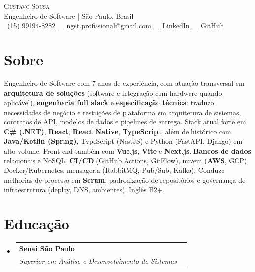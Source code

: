 \documentclass[letterpaper,11pt]{article}
\makeatletter
\newcommand{\resumeSubheading}[4]{
  \vspace{-2pt}\item
    \begin{tabular*}{1.0\textwidth}[t]{l@{\extracolsep{\fill}}r}
      \textbf{#1} & \textbf{\small #2} \\
      \textit{\small#3} & \textit{\small #4} \\
    \end{tabular*}\vspace{-7pt}
}
\newcommand{\resumeSubHeadingListStart}{\begin{itemize}[leftmargin=0.0in, label={}]}
\newcommand{\resumeSubHeadingListEnd}{\end{itemize}}
\makeatother
\begin{document}
\begin{center}
    {\Huge \scshape Gustavo Sousa} \\ \vspace{1pt}
    Engenheiro de Software \enskip | \enskip São Paulo, Brasil \\ \vspace{1pt}
    \small 
    \href{https://wa.me/+5515991948282}{\raisebox{-0.1\height}\faWhatsapp\ \underline{(15) 99194-8282}} \enskip ~
    \href{mailto:ngst.profissional@gmail.com}{\raisebox{-0.2\height}\faEnvelope\ \underline{ngst.profissional@gmail.com}} \enskip ~
    \href{https://linkedin.com/in/scryng}{\raisebox{-0.2\height}\faLinkedin\ \underline{LinkedIn}} \enskip ~
    \href{https://github.com/scryng}{\raisebox{-0.2\height}\faGithub\ \underline{GitHub}} \\
    \vspace{-8pt}
\end{center}

\section{Sobre}
    Engenheiro de Software com 7 anos de experiência, com atuação transversal em \textbf{arquitetura de soluções} (software e integração com hardware quando aplicável), \textbf{engenharia full stack} e \textbf{especificação técnica}: traduzo necessidades de negócio e restrições de plataforma em arquitetura de sistemas, contratos de API, modelos de dados e pipelines de entrega. Stack atual forte em \textbf{C\# (.NET)}, \textbf{React}, \textbf{React Native}, \textbf{TypeScript}, além de histórico com \textbf{Java/Kotlin (Spring)}, TypeScript (NestJS) e Python (FastAPI, Django) em alto volume. Front-end também com \textbf{Vue.js}, \textbf{Vite} e \textbf{Next.js}. \textbf{Bancos de dados} relacionais e NoSQL, \textbf{CI/CD} (GitHub Actions, GitFlow), nuvem (\textbf{AWS}, GCP), Docker/Kubernetes, mensageria (RabbitMQ, Pub/Sub, Kafka). Conduzo melhorias de processo em \textbf{Scrum}, padronização de repositórios e governança de infraestrutura (deploy, DNS, ambientes). Inglês B2+.
\vspace{-10pt}

\section{Educação}
  \resumeSubHeadingListStart
    \resumeSubheading
      {Senai São Paulo}{}
      {Superior em Análise e Desenvolvimento de Sistemas}{}
  \resumeSubHeadingListEnd
\vspace{-10pt}
\end{document}
